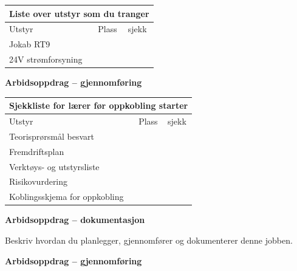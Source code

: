 \begin{center}
\begin{tabular}{ | m{8cm} | m{1cm}| m{2cm} | } 
\hline
\multicolumn{3}{|c|}{Liste over utstyr som du tranger} \\
\hline
Utstyr	& Plass & sjekk \\ 
\hline
\hline
	Jokab RT9 & & \\ 
	\hline
	24V strømforsyning &&\\
	
	\hline
\end{tabular}
\end{center}
\vskip 10pt 
\textbf{Arbidsoppdrag -- gjennomføring}

\begin{center}
\begin{tabular}{ | m{8cm} | m{1cm}| m{2cm} | } 
\hline
\multicolumn{3}{|c|}{Sjekkliste for lærer før oppkobling starter} \\
\hline
Utstyr	& Plass & sjekk \\ 
\hline
	Teorisprørsmål besvart &&\\
\hline
	Fremdriftsplan &&\\
\hline
	
	Verktøys- og utstyrsliste &&\\
\hline
	Risikovurdering &&\\ 	
	\hline
	Koblingsskjema for oppkobling &&\\
	\hline
\end{tabular}
\end{center}
\vskip 10pt 

\textbf{Arbidsoppdrag -- dokumentasjon}

Beskriv hvordan du planlegger, gjennomfører og dokumenterer denne jobben. 

\textbf{Arbidsoppdrag -- gjennomføring}

